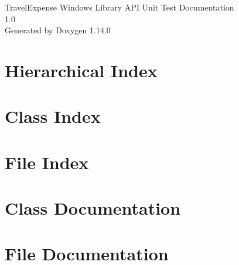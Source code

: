\documentclass[twoside]{book}
\newcommand{\+}{\discretionary{\mbox{\scriptsize$\hookleftarrow$}}{}{}}
\newcommand{\clearemptydoublepage}{%
    \newpage{\pagestyle{empty}\cleardoublepage}%
  }
\begin{document}
  \raggedbottom
    \hypersetup{pageanchor=false,
                bookmarksnumbered=true,
                pdfencoding=unicode
               }
  \begin{titlepage}
  \vspace*{7cm}
  \begin{center}%
  {\Large Travel\+Expense Windows Library API Unit Test Documentation}\\
  [1ex]\large 1.\+0 \\
  \vspace*{1cm}
  {\large Generated by Doxygen 1.14.0}\\
  \end{center}
  \end{titlepage}
  \clearemptydoublepage
  \tableofcontents
  \clearemptydoublepage
  \hypersetup{pageanchor=true}

\chapter{Hierarchical Index}

\chapter{Class Index}

\chapter{File Index}

\chapter{Class Documentation}

\chapter{File Documentation}



  \backmatter
  \newpage
  \clearemptydoublepage
  \printindex
\end{document}

